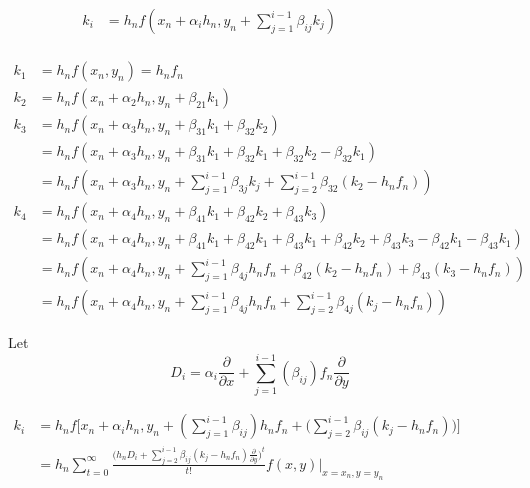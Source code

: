 \documentclass[12 pt]{article}
\begin{document}
	\begin{align*}
		k_{i} &= h_{n}f(x_{n}+\alpha_{i}h_{n}, y_{n}+\sum_{j=1}^{i-1}\beta_{ij}k_{j}) &   &   &   &    &     &	&	 & 	&\\
	\end{align*}
	
	\begin{align*}
		k_{1} &= h_{n}f(x_{n}, y_{n}) = h_{n}f_{n}\\ 
		k_{2} &= h_{n}f(x_{n}+\alpha_{2}h_{n}, y_{n}+\beta_{21}k_{1})\\
		k_{3} &= h_{n}f(x_{n}+\alpha_{3}h_{n}, y_{n} + \beta_{31}k_{1} + \beta_{32}k_{2})\\
		&= h_{n}f(x_{n}+\alpha_{3}h_{n}, y_{n} + \beta_{31}k_{1} + \beta_{32}k_{1} + \beta_{32}k_{2} - \beta_{32}k_{1})\\
		&= h_{n}f(x_{n} + \alpha_{3}h_{n}, y_{n}+\sum_{j = 1}^{i-1}\beta_{3j}k_{j} + \sum_{j=2}^{i-1}\beta_{32}(k_{2}-h_{n}f_{n}))\\
		k_{4} &= h_{n}f(x_{n}+\alpha_{4}h_{n}, y_{n} + \beta_{41}k_{1} + \beta_{42}k_{2} + \beta_{43}k_{3})\\
		&=  h_{n}f(x_{n}+\alpha_{4}h_{n}, y_{n} + \beta_{41}k_{1} + \beta_{42}k_{1} + \beta_{43}k_{1} + \beta_{42}k_{2} + \beta_{43}k_{3} - \beta_{42}k_{1} - \beta_{43}k_{1})\\
		&= h_{n}f(x_{n} + \alpha_{4}h_{n}, y_{n} + \sum_{j = 1}^{i-1}\beta_{4j}h_{n}f_{n} + \beta_{42}(k_{2} - h_{n}f_{n}) + \beta_{43}(k_{3}-h_{n}f_{n}))\\
		&= h_{n}f(x_{n} + \alpha_{4}h_{n}, y_{n} + \sum_{j = 1}^{i-1}\beta_{4j}h_{n}f_{n} + \sum_{j=2}^{i-1}\beta_{4j}(k_{j}-h_{n}f_{n}))
	\end{align*}
	
	Let {\large $$D_{i} = \alpha_{i}\frac{\partial}{\partial x} + \sum_{j = 1}^{i - 1} (\beta_{ij})f_{n}\frac{\partial}{\partial y}$$}
	
	
	\begin{align*}
		k_{i} &= h_{n}f\bigg[x_{n}+\alpha_{i}h_{n}, y_{n}+(\sum_{j=1}^{i-1}\beta_{ij})h_{n}f_{n} + \bigg(\sum_{j=2}^{i-1}\beta_{ij}(k_{j}-h_{n}f_{n})\bigg)\bigg] &    &     &     &	  &		&   &    &	  &\\
		&= h_{n}\sum_{t=0}^{\infty}\frac{\bigg(h_{n}D_{i}+\sum_{j=2}^{i-1}\beta_{ij}(k_{j}-h_{n}f_{n})\frac{\partial}{\partial y}\bigg)^{t}}{t!}f(x,y)\big\vert_{x = x_{n}, y= y_{n}} &    &     &	 &		&	   &    &	  &     &\\
	\end{align*}
	
\end{document}
